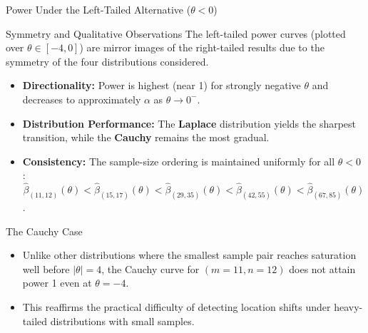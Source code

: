 \documentclass[8pt]{beamer}
\begin{document}
\begin{frame}{Power Under the Left-Tailed Alternative ($\theta < 0$)}
    \footnotesize
    \begin{block}{Symmetry and Qualitative Observations}
        The left-tailed power curves (plotted over $\theta \in [-4, 0]$) are mirror images of the right-tailed results due to the symmetry of the four distributions considered.
        \begin{itemize}
            \item \textbf{Directionality:} Power is highest (near 1) for strongly negative $\theta$ and decreases to approximately $\alpha$ as $\theta \to 0^-$.
            \item \textbf{Distribution Performance:} The \textbf{Laplace} distribution yields the sharpest transition, while the \textbf{Cauchy} remains the most gradual.
            \item \textbf{Consistency:} The sample-size ordering is maintained uniformly for all $\theta < 0$ : 
            $$\hat{\beta}_{(11,12)}(\theta) < \hat{\beta}_{(15,17)}(\theta) < \hat{\beta}_{(29,35)}(\theta) < \hat{\beta}_{(42,55)}(\theta) < \hat{\beta}_{(67,85)}(\theta)$$.
        \end{itemize}
    \end{block}

    \begin{block}{The Cauchy Case}
        \begin{itemize}
            \item Unlike other distributions where the smallest sample pair reaches saturation well before $|\theta| = 4$, the Cauchy curve for $(m=11, n=12)$ does not attain power 1 even at $\theta = -4$.
            \item This reaffirms the practical difficulty of detecting location shifts under heavy-tailed distributions with small samples.
        \end{itemize}
    \end{block}
\end{frame}
\end{document}
